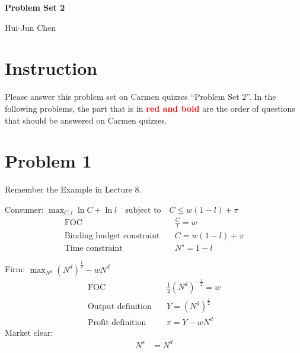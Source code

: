 \documentclass[14pt]{extarticle}
\newcommand{\red}[1]{\textcolor{red}{#1}}
\begin{document}
\centerline{\huge\bf Problem Set 2}
\smallskip
\centerline{\LARGE Hui-Jun Chen}

\medskip

\section*{Instruction}


Please answer this problem set on Carmen quizzes ``Problem Set 2''. In the following problems, the part that is in \textbf{\red{red and bold}} are the order of questions that should be answered on Carmen quizzes.


\section*{Problem 1}

Remember the Example in Lecture 8.

    Consumer: $ \max_{C, l} \ln C + \ln l \quad \text{subject to} \quad C \le w( 1-l ) + \pi $
    \begin{align}
        \text{FOC} \quad
            & \frac{C}{l} = w
            \label{eq:consumerFOC}
        \\
        \text{Binding budget constraint} \quad
            & C = w ( 1-l ) + \pi
            \label{eq:binding_budget}
        \\
        \text{Time constraint} \quad
            & N^{s} = 1 - l
            \label{eq:time_budget}
    \end{align}

    Firm: $ \max_{N^{d}} ( N^{d} )^{\frac{1}{2}} - w N^{d} $
    \begin{align}
        \text{FOC} \quad
            & \frac{1}{2} ( N^{d} )^{- \frac{1}{2}} = w
            \label{eq:firmFOC}
        \\
        \text{Output definition} \quad
            & Y = ( N^{d} )^{\frac{1}{2}}
            \label{eq:outputDef}
        \\
        \text{Profit definition} \quad
            & \pi = Y - w N^{d}
            \label{eq:profitDef}
    \end{align}
    Market clear:
    \begin{align}
        N^{s} & = N^{d}
        \label{eq:laborClear}
    \end{align}
\end{document}
